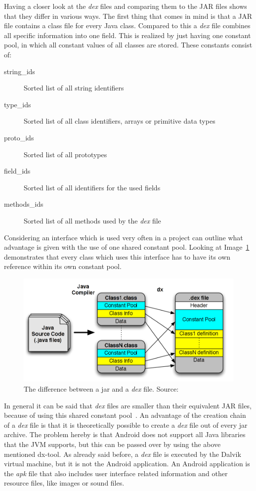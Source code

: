 Having a closer look at the \textit{dex} files and comparing them to the JAR files shows that they differ in various ways.
The first thing that comes in mind is that a JAR file contains a class file for every Java class.
Compared to this a \textit{dex} file combines all specific information into one field.
This is realized by just having one constant pool, in which all constant values of all classes are stored.
These constants consist of:
\begin{description}
  \item[string\_ids] Sorted list of all string identifiers
  \item[type\_ids] Sorted list of all class identifiers, arrays or primitive data types
  \item[proto\_ids] Sorted list of all prototypes
  \item[field\_ids] Sorted list of all identifiers for the used fields
  \item[methods\_ids] Sorted list of all methods used by the \textit{dex} file
\end{description}
Considering an interface which is used very often in a project can outline what advantage is given with the use of one shared constant pool.
Looking at Image~\ref{fig:jar-dex} demonstrates that every class which uses this interface has to have its own reference within its own constant pool.
\begin{figure}[h]
\begin{center}
\includegraphics[scale=0.41]{images/jar-dex.png} 
\caption{The difference between a jar and a \textit{dex} file. Source:~\cite{enck2011study}}
\label{fig:jar-dex}
\end{center}
\end{figure}

In general it can be said that \textit{dex} files are smaller than their equivalent JAR files, because of using this shared constant pool~\cite{bornstein2008dalvik}.
An advantage of the creation chain of a \textit{dex} file is that it is theoretically possible to create a \textit{dex} file out of every jar archive.
The problem hereby is that Android does not support all Java libraries that the JVM supports, but this can be passed over by using the above mentioned dx-tool. 
As already said before, a \textit{dex} file is executed by the Dalvik virtual machine, but it is not the Android application.
An Android application is the \textit{apk} file that also includes user interface related information and other resource files, like images or sound files.

